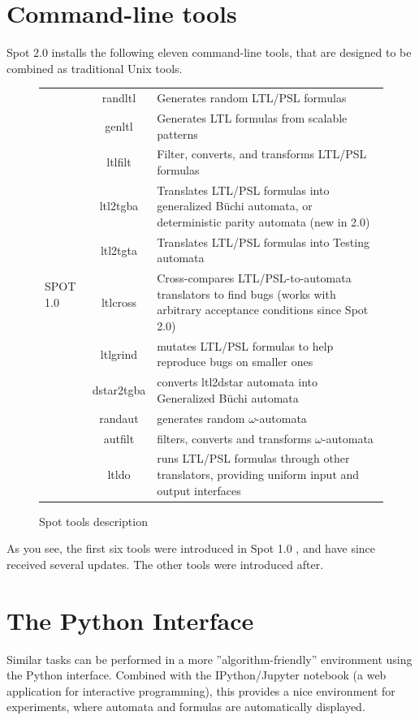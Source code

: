 \section{Command-line tools}
Spot 2.0 installs the following eleven command-line tools, that are designed to be combined as traditional
Unix tools.\\
\begin{figure}[H]
 \begin{tabular}{l c | m{8cm}}
  \multirow{13}{*}{SPOT 1.0}&randltl&Generates random LTL/PSL formulas\\
   &genltl&Generates LTL formulas from scalable patterns\\
   &ltlfilt&Filter, converts, and transforms LTL/PSL formulas\\
   &ltl2tgba&Translates LTL/PSL formulas into generalized Büchi automata\cite{7}, or deterministic parity
	     automata (new in 2.0)\\
   &ltl2tgta&Translates LTL/PSL formulas into Testing automata\cite{6}\\
   &ltlcross&Cross-compares LTL/PSL-to-automata translators to find bugs (works with arbitrary acceptance
	     conditions since Spot 2.0)\\
   \hline
   &ltlgrind&mutates LTL/PSL formulas to help reproduce bugs on smaller ones\\
   &dstar2tgba&converts ltl2dstar automata into Generalized Büchi automata\cite{14}\\
   &randaut&generates random $\omega$-automata\\
   &autfilt&filters, converts and transforms $\omega$-automata\\
   &ltldo&runs LTL/PSL formulas through other translators, providing uniform input and output interfaces\\
 \end{tabular}
 \caption{Spot tools description}
\end{figure}
As you see, the first six tools were introduced in Spot 1.0 \cite{1}, and have since received several updates. The other tools
were introduced after.

\section{The Python Interface}
Similar tasks can be performed in a more ''algorithm-friendly'' environment using the Python interface.
Combined with the IPython/Jupyter notebook \cite{4} (a web application for interactive programming), this
provides a nice environment for experiments, where automata and formulas are automatically displayed.

